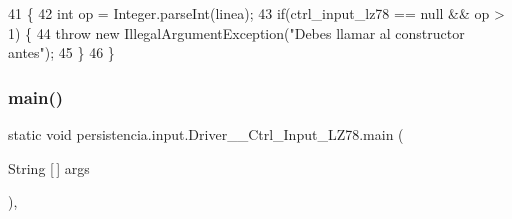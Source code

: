 \begin{DoxyCode}
41                                                                                           \{
42         \textcolor{keywordtype}{int} op = Integer.parseInt(linea);
43         \textcolor{keywordflow}{if}(ctrl\_input\_lz78 == null && op > 1) \{
44             \textcolor{keywordflow}{throw} \textcolor{keyword}{new} IllegalArgumentException(\textcolor{stringliteral}{"Debes llamar al constructor antes"});
45         \}
46     \}
\end{DoxyCode}
\mbox{\label{classpersistencia_1_1input_1_1Driver____Ctrl__Input__LZ78_adb756847df72081fa229549543e03569}} 
\subsubsection{\texorpdfstring{main()}{main()}}
{\footnotesize\ttfamily static void persistencia.\+input.\+Driver\+\_\+\+\_\+\+Ctrl\+\_\+\+Input\+\_\+\+L\+Z78.\+main (\begin{DoxyParamCaption}\item[{String \mbox{[}$\,$\mbox{]}}]{args }\end{DoxyParamCaption})\hspace{0.3cm}{\ttfamily [inline]}, {\ttfamily [static]}}


